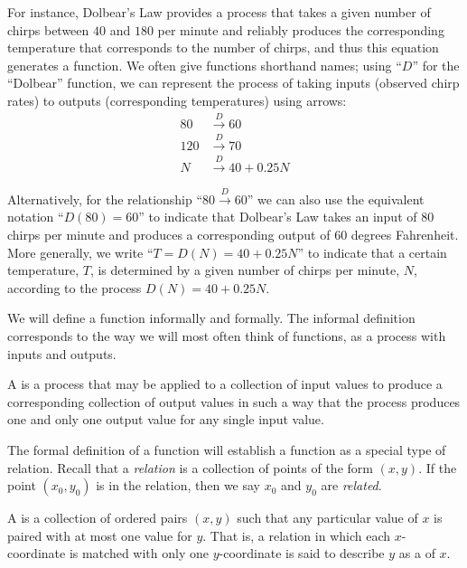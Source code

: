 \documentclass[noauthor, nooutcomes]{ximera}
\begin{document}
For instance, Dolbear's Law provides a process that takes a given number of chirps between $40$ and $180$ per minute and reliably produces the corresponding temperature that corresponds to the number of chirps, and thus this equation generates a function.  We often give functions shorthand names; using ``$D$'' for the ``Dolbear'' function, we can represent the process of taking inputs (observed chirp rates) to outputs (corresponding temperatures) using arrows:%
\begin{align*}
80 &\xrightarrow{D} 60\\
120 &\xrightarrow{D} 70\\
N &\xrightarrow{D} 40 + 0.25 N
\end{align*}

Alternatively, for the relationship ``$80 \xrightarrow{D} 60$'' we can also use the equivalent notation ``$D(80) = 60$'' to indicate that Dolbear's Law takes an input of $80$ chirps per minute and produces a corresponding output of $60$ degrees Fahrenheit.  More generally, we write ``$T = D(N) = 40 + 0.25N$'' to indicate that a certain temperature, $T$, is determined by a given number of chirps per minute, $N$, according to the process $D(N) = 40 + 0.25N$.


We will define a function informally and formally.  The informal definition corresponds to the way we will most often think of functions, as a process with inputs and outputs.  

\begin{definition}
A  is a process that may be applied to a collection of input values to produce a corresponding collection of output values in such a way that the process produces one and only one output value for any single input value.
\end{definition}

The formal definition of a function will establish a function as a special type of relation.  Recall that a \emph{relation} is a collection of points of the form $(x,y)$.  If the point $(x_0,y_0)$ is in the relation, then we say $x_0$ and $y_0$ are \emph{related}.

\begin{definition}
A  is a collection of ordered pairs $(x,y)$ such that any particular value of $x$ is paired with at most one value for $y$. That is, a relation in which each $x$-coordinate is matched with only one $y$-coordinate is said to describe $y$ as a  of $x$.
\end{definition}
\end{document}
